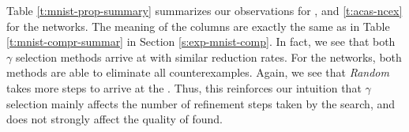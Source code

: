 Table \ref{t:mnist-prop-summary} summarizes our observations for \mnist, and
\ref{t:acas-ncex} for the \acasxu networks. The meaning of the columns are
exactly the same as in Table \ref{t:mnist-compr-summar} in Section
\ref{s:exp-mnist-comp}. In fact, we see that both $\gamma$ selection methods
arrive at \abs with similar reduction rates. For the \mnist networks, both
methods are able to eliminate all counterexamples.  Again, we see that
\textit{Random} takes more steps to arrive at the \abs. Thus, this reinforces
our intuition that $\gamma$ selection mainly affects the number of refinement
steps taken by the search, and does not strongly affect the quality of \abs
found.



